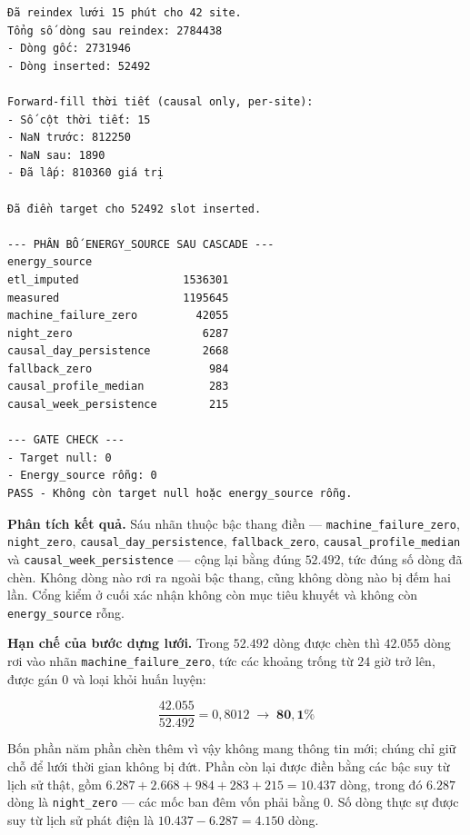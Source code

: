 \begingroup
\par{}\vspace{8pt}
\small\renewcommand{\baselinestretch}{1.0}\selectfont
\begin{verbatim}
Đã reindex lưới 15 phút cho 42 site.
Tổng số dòng sau reindex: 2784438
- Dòng gốc: 2731946
- Dòng inserted: 52492

Forward-fill thời tiết (causal only, per-site):
- Số cột thời tiết: 15
- NaN trước: 812250
- NaN sau: 1890
- Đã lấp: 810360 giá trị

Đã điền target cho 52492 slot inserted.

--- PHÂN BỐ ENERGY_SOURCE SAU CASCADE ---
energy_source
etl_imputed                1536301
measured                   1195645
machine_failure_zero         42055
night_zero                    6287
causal_day_persistence        2668
fallback_zero                  984
causal_profile_median          283
causal_week_persistence        215

--- GATE CHECK ---
- Target null: 0
- Energy_source rỗng: 0
PASS - Không còn target null hoặc energy_source rỗng.
\end{verbatim}
\par\vspace{8pt}
\endgroup

\textbf{Phân tích kết quả.} Sáu nhãn thuộc bậc thang điền --- \texttt{machine\_failure\_zero},
\texttt{night\_zero}, \texttt{causal\_day\_persistence}, \texttt{fallback\_zero},
\texttt{causal\_profile\_median} và \texttt{causal\_week\_persistence} --- cộng lại bằng đúng
$52.492$, tức đúng số dòng đã chèn. Không dòng nào rơi ra ngoài bậc thang, cũng không dòng
nào bị đếm hai lần. Cổng kiểm ở cuối xác nhận không còn mục tiêu khuyết và không còn
\texttt{energy\_source} rỗng.

\textbf{Hạn chế của bước dựng lưới.} Trong $52.492$ dòng được chèn thì $42.055$ dòng rơi vào
nhãn \texttt{machine\_failure\_zero}, tức các khoảng trống từ $24$ giờ trở lên, được gán $0$ và
loại khỏi huấn luyện:

\begin{equation}
\frac{42.055}{52.492} = 0{,}8012 \;\longrightarrow\; \mathbf{80{,}1\%}
\end{equation}

Bốn phần năm phần chèn thêm vì vậy không mang thông tin mới; chúng chỉ giữ chỗ để
lưới thời gian không bị đứt. Phần còn lại được điền bằng các bậc suy từ lịch sử thật, gồm
$6.287 + 2.668 + 984 + 283 + 215 = 10.437$ dòng, trong đó $6.287$ dòng là \texttt{night\_zero}
--- các mốc ban đêm vốn phải bằng $0$. Số dòng thực sự được suy từ lịch sử phát điện là
$10.437 - 6.287 = \mathbf{4.150}$ dòng.

